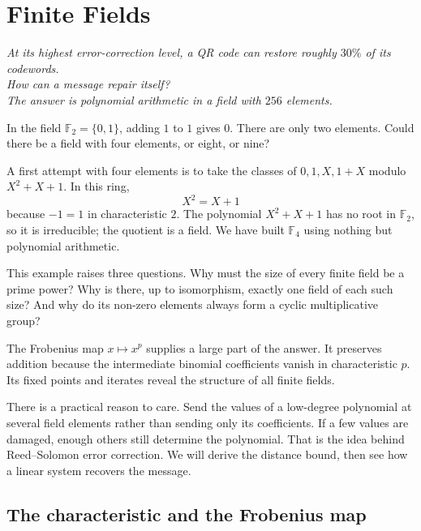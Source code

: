 \chapter{Finite Fields}

\begin{center}\itshape
At its highest error-correction level, a QR code can restore roughly $30\%$ of its codewords.\\
How can a message repair itself?\\
The answer is polynomial arithmetic in a field with $256$ elements.
\end{center}

In the field $\mathbb F_2=\{0,1\}$, adding $1$ to $1$ gives $0$. There are only two elements. Could there be a field with four elements, or eight, or nine?

A first attempt with four elements is to take the classes of $0,1,X,1+X$ modulo $X^2+X+1$. In this ring,
\[
X^2=X+1
\]
because $-1=1$ in characteristic $2$. The polynomial $X^2+X+1$ has no root in $\mathbb F_2$, so it is irreducible; the quotient is a field. We have built $\mathbb F_4$ using nothing but polynomial arithmetic.

This example raises three questions. Why must the size of every finite field be a prime power? Why is there, up to isomorphism, exactly one field of each such size? And why do its non-zero elements always form a cyclic multiplicative group?

The Frobenius map $x\mapsto x^p$ supplies a large part of the answer. It preserves addition because the intermediate binomial coefficients vanish in characteristic $p$. Its fixed points and iterates reveal the structure of all finite fields.

There is a practical reason to care. Send the values of a low-degree polynomial at several field elements rather than sending only its coefficients. If a few values are damaged, enough others still determine the polynomial. That is the idea behind Reed--Solomon error correction. We will derive the distance bound, then see how a linear system recovers the message.

\section{The characteristic and the Frobenius map}

